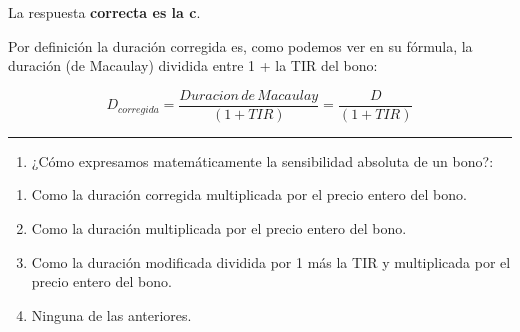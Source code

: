 \documentclass[
  letterpaper,
  DIV=11,
  numbers=noendperiod]{scrreprt}
\providecommand{\tightlist}{%
  \setlength{\itemsep}{0pt}\setlength{\parskip}{0pt}}\usepackage{longtable,booktabs,array}
\begin{document}
\begin{tcolorbox}
\begin{tcolorbox}[enhanced jigsaw, toprule=.15mm, left=2mm, arc=.35mm, breakable, bottomrule=.15mm, opacityback=0, rightrule=.15mm, leftrule=.75mm, colframe=quarto-callout-note-color-frame, colback=white]
\begin{minipage}[t]{5.5mm}
\textcolor{quarto-callout-note-color}{\faInfo}
\end{minipage}%
\begin{minipage}[t]{\textwidth - 5.5mm}

La respuesta \textbf{correcta es la c}.

Por definición la duración corregida es, como podemos ver en su fórmula,
la duración (de Macaulay) dividida entre 1 + la TIR del bono:

\[D_{corregida}=\frac{Duracion\,de\, Macaulay}{\left(1+TIR\right)}=\frac{D}{\left(1+TIR\right)} \]

\end{minipage}%
\end{tcolorbox}

\begin{center}\rule{0.5\linewidth}{0.5pt}\end{center}

\begin{enumerate}
\def\labelenumi{\arabic{enumi}.}
\setcounter{enumi}{18}
\tightlist
\item
  ¿Cómo expresamos matemáticamente la sensibilidad absoluta de un bono?:
\end{enumerate}

\begin{enumerate}
\def\labelenumi{\alph{enumi}.}
\item
  Como la duración corregida multiplicada por el precio entero del bono.
\item
  Como la duración multiplicada por el precio entero del bono.
\item
  Como la duración modificada dividida por 1 más la TIR y multiplicada
  por el precio entero del bono.
\item
  Ninguna de las anteriores.
\end{enumerate}

\begin{tcolorbox}[enhanced jigsaw, toprule=.15mm, left=2mm, arc=.35mm, breakable, bottomrule=.15mm, opacityback=0, rightrule=.15mm, leftrule=.75mm, colframe=quarto-callout-note-color-frame, colback=white]
\begin{minipage}[t]{5.5mm}
\textcolor{quarto-callout-note-color}{\faInfo}
\end{minipage}%
\begin{minipage}[t]{\textwidth - 5.5mm}


\end{minipage}
\end{tcolorbox}
\end{tcolorbox}
\end{document}
